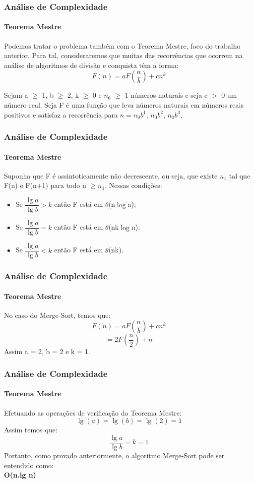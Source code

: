 \documentclass[aspectratio=169]{beamer}
\begin{document}
\begin{frame}
	\frametitle{Análise de Complexidade}
	\framesubtitle{Teorema Mestre}
	Podemos tratar o problema também com o Teorema Mestre, foco do trabalho anterior. Para tal, consideraremos que muitas das recorrências que ocorrem na análise de algoritmos de divisão e conquista têm a forma:
	\begin{equation}
	F(n) = aF\left(\dfrac{n}{b}\right) + cn^{k}
	\end{equation}
	\begin{theorem}
		Sejam a $ \geq $  1, b $ \geq $ 2, k $ \geq $ 0 e $ n_{0} $ $ \geq $ 1 números naturais e seja c $ > $ 0 um número real.  Seja F é uma função que leva números naturais em números reais positivos e satisfaz a recorrência para $n = n_{0}b^{1} $, $ n_{0}b^{2} $, $ n_{0}b^{3} $, 
	
	\end{theorem}
	
	
\end{frame}

\begin{frame}
	\frametitle{Análise de Complexidade}
	\framesubtitle{Teorema Mestre}
	\begin{theorem}
	Suponha que F é assintoticamente não decrescente, ou seja, que existe $ n_{1} $ tal que F(n) e F(n+1) para todo n $\geq n_{1}$. Nessas condições:
\end{theorem}
	
	\begin{itemize}
		\item Se $\dfrac{\lg a}{\lg b} > k$ então F está em $\theta$(n$\log$a); 
		\item Se $\dfrac{\lg a}{\lg b} = k$ então F está em $\theta$(nk$\log$n);
		\item Se $\dfrac{\lg a}{\lg b} < k$ então F está em $\theta$(nk). 
	\end{itemize}

\end{frame}

\begin{frame}
	\frametitle{Análise de Complexidade}
	\framesubtitle{Teorema Mestre}
	No caso do Merge-Sort, temos que:
	\begin{equation}
	F(n) = aF\left(\dfrac{n}{b}\right) + cn^{k}
	\end{equation}
	\begin{equation}
	= 2F\left(\dfrac{n}{2}\right) + n
	\end{equation}
	Assim a = 2, b = 2 e k = 1.\\
\end{frame}
\begin{frame}
\frametitle{Análise de Complexidade}
\framesubtitle{Teorema Mestre}
Efetuando as operações de verificação do Teorema Mestre:
\begin{equation}
\lg (a) = \lg (b) = \lg (2) = 1
\end{equation}
Assim temos que:
\begin{equation}
\dfrac{\lg a}{\lg b} = k = 1
\end{equation}
Portanto, como provado anteriormente, o algoritmo Merge-Sort pode ser entendido como:\\
\textbf{O(n.lg n)}	
\end{frame}
		
\end{document}
